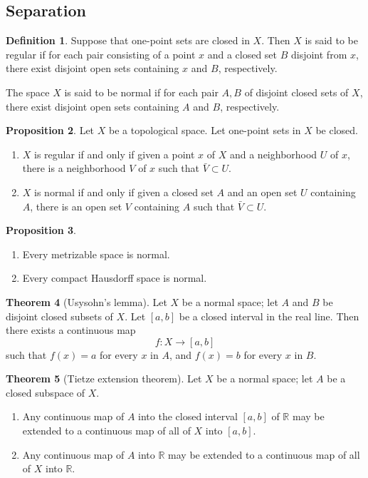 \documentclass[12pt,a4paper]{book}
\newenvironment{enu}{\begin{enumerate}[(1)]}{\end{enumerate}}
\theoremstyle{definition}
\newtheorem{defn}{Definition}[section]
\newtheorem{theo}[defn]{Theorem}
\newtheorem{prop}[defn]{Proposition}
\begin{document}
\newpage 
\subsection{Separation}
\begin{defn}
    Suppose that one-point sets are closed in $X$. Then $X$ is said to be regular if for each pair consisting of a point $x$ and a closed set $B$ disjoint from $x$, there exist disjoint open sets containing $x$ and $B$, respectively.

    The space $X$ is said to be normal if for each pair $A, B$ of disjoint closed sets of $X$, there exist disjoint open sets containing $A$ and $B$, respectively.
\end{defn}
\begin{prop}
    Let $X$ be a topological space. Let one-point sets in $X$ be closed.
    \begin{enu}
        \item $X$ is regular if and only if given a point $x$ of $X$ and a neighborhood $U$ of $x$, there is a neighborhood $V$ of $x$ such that $\bar{V} \subset U$.
        \item $X$ is normal if and only if given a closed set $A$ and an open set $U$ containing $A$, there is an open set $V$ containing $A$ such that $\bar{V} \subset U$.
    \end{enu}
\end{prop}
\begin{prop}
    \begin{enu}
        \item Every metrizable space is normal.

        \item Every compact Hausdorff space is normal.
    \end{enu}
\end{prop}
\begin{theo}[Usysohn's lemma]
    Let $X$ be a normal space; let $A$ and $B$ be disjoint closed subsets of $X$. Let $[a, b]$ be a closed interval in the real line. Then there exists a continuous map
    $$
        f: X \longrightarrow[a, b]
    $$
    such that $f(x)=a$ for every $x$ in $A$, and $f(x)=b$ for every $x$ in $B$.
\end{theo}
\begin{theo}[Tietze extension theorem]
    Let $X$ be a normal space; let $A$ be a closed subspace of $X$.
    \begin{enu}
        \item Any continuous map of $A$ into the closed interval $[a, b]$ of $\mathbb{R}$ may be extended to a continuous map of all of $X$ into $[a, b]$.
        \item Any continuous map of $A$ into $\mathbb{R}$ may be extended to a continuous map of all of $X$ into $\mathbb{R}$.
    \end{enu}
\end{theo}
\end{document}
